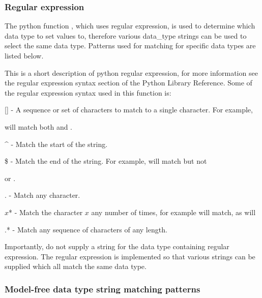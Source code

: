 




\subsubsection{Regular expression}

The python function 
, which uses regular expression, is used to determine which data
type to set values to, therefore various data\_type strings can be used to select the same
data type.  Patterns used for matching for specific data types are listed below.

This is a short description of python regular expression, for more information see the
regular expression syntax section of the Python Library Reference.  Some of the regular
expression syntax used in this function is:

    [] - A sequence or set of characters to match to a single character.  For example,
    
 will match both 
 and 
.

    \^{} - Match the start of the string.

    \$ - Match the end of the string.  For example, 
 will match 
 but not 

    or 
.

    . - Match any character.

    $x$* - Match the character $x$ any number of times, for example 
 will match, as will
    


    .* - Match any sequence of characters of any length.

Importantly, do not supply a string for the data type containing regular expression.  The
regular expression is implemented so that various strings can be supplied which all match
the same data type.


\subsubsection{Model-free data type string matching patterns}




